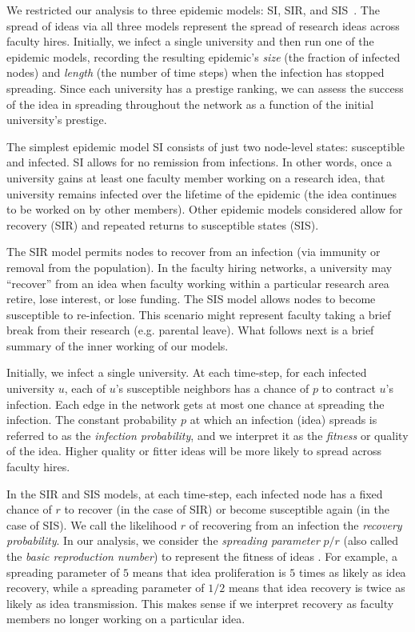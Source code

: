 \documentclass[%
 reprint,
 amsmath,amssymb,
 aps,
]{revtex4-1}
\begin{document}
We restricted our analysis to three epidemic models: SI, SIR, and SIS~\cite{newman:networks}. The spread of ideas via all three models represent the spread of research ideas across faculty hires. Initially, we infect a single university and then run one of the epidemic models, recording the resulting epidemic's \emph{size} (the fraction of infected nodes) and \emph{length} (the number of time steps) when the infection has stopped spreading. Since each university has a prestige ranking, we can assess the success of the idea in spreading throughout the network as a function of the initial university's prestige.

The simplest epidemic model SI consists of just two node-level states: susceptible and infected. SI allows for no remission from infections. In other words, once a university gains at least one faculty member working on a research idea, that university remains infected over the lifetime of the epidemic (the idea continues to be worked on by other members). Other epidemic models considered allow for recovery (SIR) and repeated returns to susceptible states (SIS).

The SIR model permits nodes to recover from an infection (via immunity or removal from the population). In the faculty hiring networks, a university may ``recover'' from an idea when faculty working within a particular research area retire, lose interest, or lose funding. The SIS model allows nodes to become susceptible to re-infection. This scenario might represent faculty taking a brief break from their research (e.g. parental leave). What follows next is a brief summary of the inner working of our models.

Initially, we infect a single university. At each time-step, for each infected university $u$, each of $u$'s susceptible neighbors has a chance of $p$ to contract $u$'s infection. Each edge in the network gets at most one chance at spreading the infection. The constant probability $p$ at which an infection (idea) spreads is referred to as the \emph{infection probability}, and we interpret it as the \emph{fitness} or quality of the idea. Higher quality or fitter ideas will be more likely to spread across faculty hires.

In the SIR and SIS models, at each time-step, each infected node has a fixed chance of $r$ to recover (in the case of SIR) or become susceptible again (in the case of SIS). We call the likelihood $r$ of recovering from an infection the \emph{recovery probability}. In our analysis, we consider the \emph{spreading parameter} $p/r$ (also called the \emph{basic reproduction number}) to represent the fitness of ideas \cite{jones:reproduction}. For example, a spreading parameter of $5$ means that idea proliferation is $5$ times as likely as idea recovery, while a spreading parameter of $1/2$ means that idea recovery is twice as likely as idea transmission. This makes sense if we interpret recovery as faculty members no longer working on a particular idea.
\end{document}
